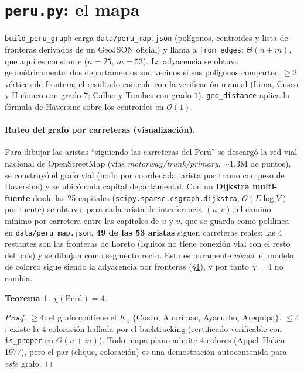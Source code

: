 \documentclass[11pt,a4paper]{article}
\newtheorem{teorema}{Teorema}[section]
\theoremstyle{definition}
\theoremstyle{remark}
\newcommand{\bigO}{\mathcal{O}}
\begin{document}
\section{\texttt{peru.py}: el mapa}\label{sec:peru}
\texttt{build\_peru\_graph} carga \texttt{data/peru\_map.json} (polígonos,
centroides y lista de fronteras derivados de un GeoJSON oficial) y llama a
\texttt{from\_edges}: $\Theta(n+m)$, que aquí es constante ($n{=}25$, $m{=}53$).
La adyacencia se obtuvo geométricamente: dos departamentos son vecinos si sus
polígonos comparten $\ge 2$ vértices de frontera; el resultado coincide con la
verificación manual (Lima, Cusco y Huánuco con grado $7$; Callao y Tumbes con
grado $1$). \texttt{geo\_distance} aplica la fórmula de Haversine sobre los
centroides en $\bigO(1)$.

\paragraph{Ruteo del grafo por carreteras (visualización).} Para dibujar las
aristas ``siguiendo las carreteras del Perú'' se descargó la red vial nacional de
OpenStreetMap (vías \emph{motorway/trunk/primary}, $\sim\!1.3$M de puntos), se
construyó el grafo vial (nodo por coordenada, arista por tramo con peso de
Haversine) y se ubicó cada capital departamental. Con un \textbf{Dijkstra
multi-fuente} desde las 25 capitales (\texttt{scipy.sparse.csgraph.dijkstra},
$\bigO(E\log V)$ por fuente) se obtuvo, para cada arista de interferencia
$(u,v)$, el camino mínimo por carretera entre las capitales de $u$ y $v$, que se
guarda como polilínea en \texttt{data/peru\_map.json}. \textbf{49 de las 53
aristas} siguen carreteras reales; las $4$ restantes son las fronteras de Loreto
(Iquitos no tiene conexión vial con el resto del país) y se dibujan como segmento
recto. Esto es puramente \emph{visual}: el modelo de coloreo sigue siendo la
adyacencia por fronteras (\S\ref{teo:chi}), y por tanto $\chi=4$ no cambia.

\begin{teorema}\label{teo:chi}
$\chi(\text{Perú})=4$.
\end{teorema}
\begin{proof}
$\ge4$: el grafo contiene el $K_4$ $\{$Cusco, Apurímac, Ayacucho, Arequipa$\}$.
$\le4$: existe la $4$-coloración hallada por el backtracking (certificado
verificable con \texttt{is\_proper} en $\Theta(n+m)$). Todo mapa plano admite $4$
colores (Appel--Haken 1977), pero el par (clique, coloración) es una demostración
autocontenida para \emph{este} grafo.
\end{proof}
\end{document}
